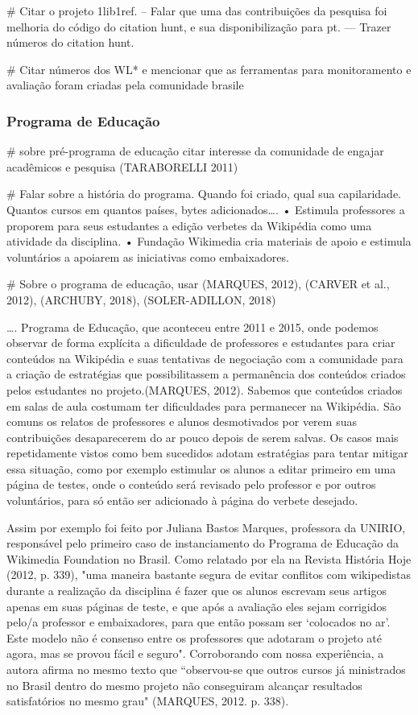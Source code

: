 # Citar o projeto 1lib1ref.
-- Falar que uma das contribuições da pesquisa foi melhoria do código do citation hunt, e sua disponibilização para pt.
--- Trazer números do citation hunt.

# Citar números dos WL* e mencionar que as ferramentas para monitoramento e avaliação foram criadas pela comunidade brasile

\subsubsection{Programa de Educação}

# sobre pré-programa de educação citar interesse da comunidade de engajar acadêmicos e pesquisa (TARABORELLI 2011)

# Falar sobre a história do programa. Quando foi criado, qual sua capilaridade. Quantos cursos em quantos países, bytes adicionados….
    • Estimula professores a proporem para seus estudantes a edição verbetes da Wikipédia como uma atividade da disciplina.
    • Fundação Wikimedia cria materiais de apoio e estimula voluntários a apoiarem as iniciativas como embaixadores.

# Sobre o programa de educação, usar (MARQUES, 2012), (CARVER et al., 2012), (ARCHUBY, 2018), (SOLER-ADILLON, 2018)

…. Programa de Educação, que aconteceu entre 2011 e 2015, onde podemos observar de forma explícita a dificuldade de professores e estudantes para criar conteúdos na Wikipédia e suas tentativas de negociação com a comunidade para a criação de estratégias que possibilitassem a permanência dos conteúdos criados pelos estudantes no projeto.(MARQUES, 2012).
Sabemos que conteúdos criados em salas de aula costumam ter dificuldades para permanecer na Wikipédia. São comuns os relatos de professores e alunos desmotivados por verem suas contribuições desaparecerem do ar pouco depois de serem salvas. Os casos mais repetidamente vistos como bem sucedidos adotam estratégias para tentar mitigar essa situação, como por exemplo estimular os alunos a editar primeiro em uma página de testes, onde o conteúdo será revisado pelo professor e por outros voluntários, para só então ser adicionado à página do verbete desejado.

Assim por exemplo foi feito por Juliana Bastos Marques, professora da UNIRIO, responsável pelo primeiro caso de instanciamento do Programa de Educação da Wikimedia Foundation no Brasil. Como relatado por ela na Revista História Hoje (2012, p. 339), "uma maneira bastante segura de evitar conflitos com wikipedistas durante a realização da disciplina é fazer que os alunos escrevam seus artigos apenas em suas páginas de teste, e que após a avaliação eles sejam corrigidos pelo/a professor e embaixadores, para que então possam ser ‘colocados no ar’. Este modelo não é consenso entre os professores que adotaram o projeto até agora, mas se provou fácil e seguro". Corroborando com nossa experiência, a autora afirma no mesmo texto que “observou-se que outros cursos já ministrados no Brasil dentro do mesmo projeto não conseguiram alcançar resultados satisfatórios no mesmo grau" (MARQUES, 2012. p. 338).

